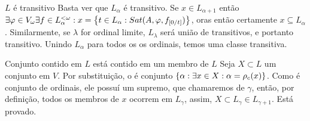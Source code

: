         \begin{lemma}{$L$ é transitivo}
            Basta ver que $L_\alpha$ é transitivo. Se $x\in L_{\alpha+1}$ então $\exists\varphi\in V_\omega\exists f\in L_\alpha^{<\omega}: x 
            = \SET{t\in L_\alpha : Sat(A,\varphi,f_{[0\slash t]})}$, oras então certamente $x \subseteq L_\alpha$. Similarmente, 
            se $\lambda$ for ordinal limite, $L_\lambda$ será união de transitivos, e portanto transitivo. Unindo $L_\alpha$ para todos os 
            os ordinais, temos uma classe transitiva.
        \end{lemma}
        \begin{lemma}{Conjunto contido em $L$ está contido em um membro de $L$}
            Seja $X\subset L$ um conjunto em $V$. Por substituição, o é conjunto $\SET{\alpha: \exists x\in X:\alpha = \rho_c(x)}$. 
            Como é conjunto de ordinais, ele possuí um supremo, que chamaremos de $\gamma$, então, por definição, todos os membros 
            de $x$ ocorrem em $L_\gamma$, assim, $X\subset L_\gamma\in L_{\gamma+1}$. Está provado.
        \end{lemma}

